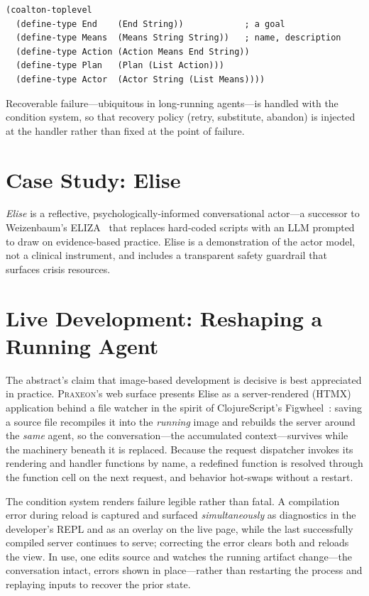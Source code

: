\documentclass[11pt,a4paper]{article}
\begin{document}
\begin{lstlisting}
(coalton-toplevel
  (define-type End    (End String))            ; a goal
  (define-type Means  (Means String String))   ; name, description
  (define-type Action (Action Means End String))
  (define-type Plan   (Plan (List Action)))
  (define-type Actor  (Actor String (List Means))))
\end{lstlisting}

Recoverable failure---ubiquitous in long-running agents---is handled with the
condition system, so that recovery policy (retry, substitute, abandon) is
injected at the handler rather than fixed at the point of failure.

\section{Case Study: Elise}
\label{sec:elise}
\emph{Elise} is a reflective, psychologically-informed conversational actor---a
successor to Weizenbaum's ELIZA~\citep{weizenbaum1966eliza} that replaces
hard-coded scripts with an LLM prompted to draw on evidence-based practice. Elise
is a demonstration of the actor model, not a clinical instrument, and includes a
transparent safety guardrail that surfaces crisis resources.

\section{Live Development: Reshaping a Running Agent}
\label{sec:live}
The abstract's claim that image-based development is decisive is best appreciated
in practice. \textsc{Praxeon}'s web surface presents Elise as a server-rendered
(HTMX) application behind a file watcher in the spirit of ClojureScript's
Figwheel~\citep{figwheel}: saving a source file recompiles it into the
\emph{running} image and rebuilds the server around the \emph{same} agent, so the
conversation---the accumulated context---survives while the machinery beneath it
is replaced. Because the request dispatcher invokes its rendering and handler
functions by name, a redefined function is resolved through the function cell on
the next request, and behavior hot-swaps without a restart.

The condition system renders failure legible rather than fatal. A compilation
error during reload is captured and surfaced \emph{simultaneously} as diagnostics
in the developer's REPL and as an overlay on the live page, while the last
successfully compiled server continues to serve; correcting the error clears both
and reloads the view. In use, one edits source and watches the running artifact
change---the conversation intact, errors shown in place---rather than restarting
the process and replaying inputs to recover the prior state.
\end{document}
